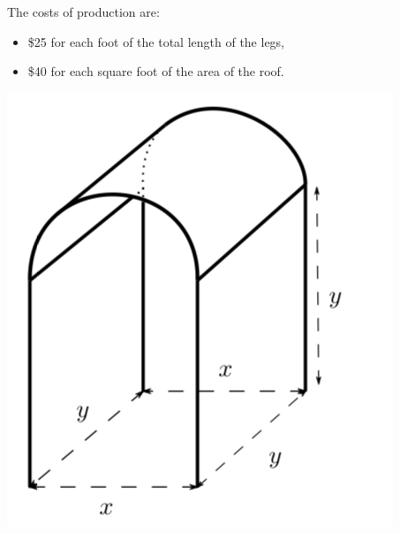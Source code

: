 \documentclass[11pt]{exam}
\begin{document}
\begin{questions}
\begin{minipage}{0.6\textwidth}
The costs of production are:
\begin{itemize}
\item \$25 for each foot of the total length of the legs, 
\item \$40 for each square foot of the area of the roof.
\end{itemize}
\end{minipage}
\begin{minipage}{0.3\textwidth}
  \begin{center}
    \includegraphics[scale=0.4]{pta.png}
  \end{center}
\end{minipage}


\end{questions}
\end{document}

